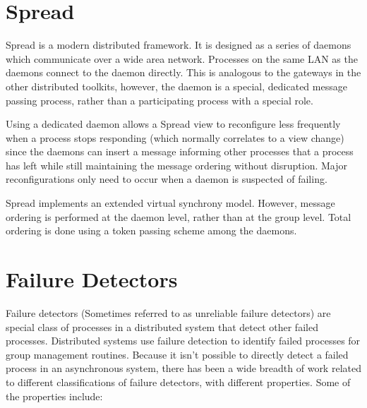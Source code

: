 \section{Spread}

Spread\cite{SPREADTOOLKIT} is a modern distributed framework. It is designed as a series of daemons which communicate over a wide area network. Processes on the same LAN as the daemons connect to the daemon directly. This is analogous to the gateways in the other distributed toolkits, however, the daemon is a special, dedicated message passing process, rather than a participating process with a special role.

Using a dedicated daemon allows a Spread view to reconfigure less frequently when a process stops responding (which normally correlates to a view change) since the daemons can insert a message informing other processes that a process has left while still maintaining the message ordering without disruption. Major reconfigurations only need to occur when a daemon is suspected of failing.

Spread implements an extended virtual synchrony model. However, message ordering is performed at the daemon level, rather than at the group level. Total ordering is done using a token passing scheme among the daemons.

\section{Failure Detectors}

Failure detectors \cite{FAILUREDETECTORS} (Sometimes referred to as unreliable failure detectors) are special class of processes in a distributed system that detect other failed processes. Distributed systems use failure detection to identify failed processes for group management routines. Because it isn't possible to directly detect a failed process in an asynchronous system, there has been a wide breadth of work related to different classifications of failure detectors, with different properties. Some of the properties include\cite{FAILUREDETECTORS}:

